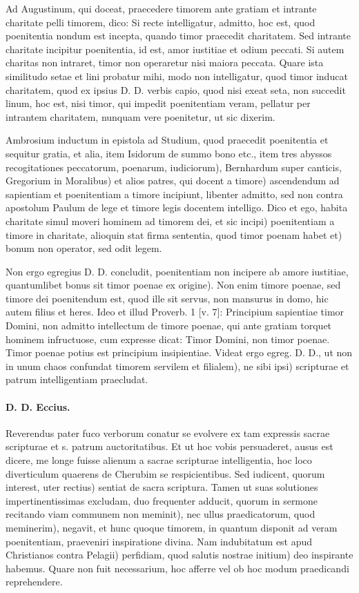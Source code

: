 Ad Augustinum, qui doceat, praecedere timorem ante gratiam et intrante charitate pelli timorem, dico: Si recte intelligatur, admitto, hoc est, quod poenitentia nondum est incepta, quando timor praecedit charitatem. Sed intrante charitate incipitur poenitentia, id est, amor iustitiae et odium peccati. Si autem charitas non intraret, timor non operaretur nisi maiora peccata. Quare ista similitudo setae et lini probatur mihi, modo non intelligatur, quod timor inducat charitatem, quod ex ipsius D. D. verbis capio, quod nisi exeat seta, \marginpar{\small[364]} non succedit linum, hoc est, nisi timor, qui impedit poenitentiam veram, pellatur per intrantem charitatem, nunquam vere poenitetur, ut sic dixerim.

Ambrosium inductum in epistola ad Studium, quod praecedit poenitentia et sequitur gratia, et alia, item Isidorum de summo bono etc., item tres abyssos recogitationes peccatorum, poenarum, iudiciorum), Bernhardum super canticis, Gregorium in Moralibus) et alios patres, qui docent a timore) ascendendum ad sapientiam et poenitentiam a timore incipiunt, libenter admitto, sed non contra apostolum Paulum de lege et timore legis docentem intelligo. Dico et ego, habita charitate simul moveri hominem ad timorem dei, et sic incipi) poenitentiam a timore in charitate, alioquin stat firma sententia, quod timor poenam habet et) bonum non operator, sed odit legem.

Non ergo egregius D. D. concludit, poenitentiam non incipere ab amore iustitiae, quantumlibet bonus sit timor poenae ex origine). Non enim timore poenae, sed timore dei poenitendum est, quod ille sit servus, non mansurus in domo, hic autem filius et heres. Ideo et illud Proverb. 1 [v. 7]: Principium sapientiae timor Domini, non admitto intellectum de timore poenae, qui ante gratiam torquet hominem infructuose, cum expresse dicat: Timor Domini, non timor poenae. Timor poenae potius est principium insipientiae. Videat ergo egreg. D. D., ut non in unum chaos confundat timorem servilem et filialem), ne sibi ipsi) scripturae et patrum intelligentiam praecludat.

\paragraph*{D. D. Eccius.}

Reverendus pater fuco verborum conatur se evolvere ex tam expressis sacrae scripturae et s. patrum auctoritatibus. Et ut hoc vobis persuaderet, ausus est dicere, me longe fuisse alienum a sacrae scripturae intelligentia, hoc loco diverticulum quaerens de Cherubim se respicientibus. Sed iudicent, quorum interest, uter rectius) sentiat de sacra scriptura. Tamen ut suas solutiones impertinentissimas excludam, duo frequenter adducit, quorum in sermone recitando viam communem non meminit), nec ullus praedicatorum, quod meminerim), negavit, et hunc quoque timorem, in quantum disponit ad veram poenitentiam, praeveniri inspiratione divina. Nam indubitatum est apud Christianos contra Pelagii) perfidiam, quod salutis nostrae initium) deo inspirante habemus. Quare non fuit necessarium, hoc afferre vel ob hoc modum praedicandi reprehendere.

